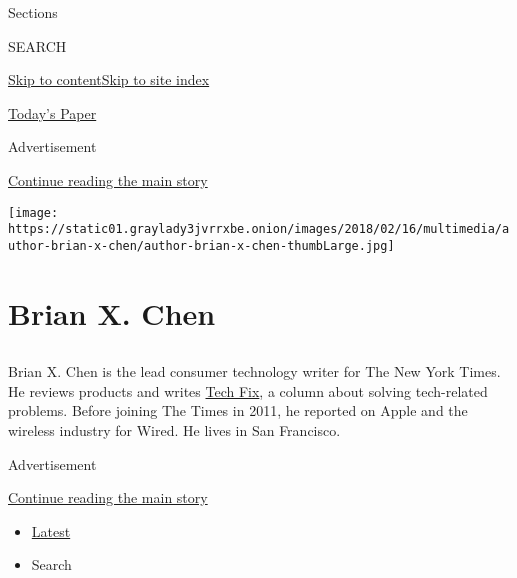 Sections

SEARCH

\protect\hyperlink{site-content}{Skip to
content}\protect\hyperlink{site-index}{Skip to site index}

\href{https://myaccount.nytimes3xbfgragh.onion/auth/login?response_type=cookie\&client_id=vi}{}

\href{https://www.nytimes3xbfgragh.onion/section/todayspaper}{Today's
Paper}

Advertisement

\protect\hyperlink{after-top}{Continue reading the main story}

\texttt{[image: https://static01.graylady3jvrrxbe.onion/images/2018/02/16/multimedia/author-brian-x-chen/author-brian-x-chen-thumbLarge.jpg]}

\hypertarget{brian-x-chen}{%
\section{Brian X. Chen}\label{brian-x-chen}}

\hypertarget{section}{%
\subsection{}\label{section}}

Brian X. Chen is the lead consumer technology writer for The New York
Times. He reviews products and writes
\href{http://www.nytimes3xbfgragh.onion/column/tech-fix}{Tech Fix}, a
column about solving tech-related problems. Before joining The Times in
2011, he reported on Apple and the wireless industry for Wired. He lives
in San Francisco.

Advertisement

\protect\hyperlink{after-mid1}{Continue reading the main story}

\begin{itemize}
\tightlist
\item
  \protect\hyperlink{stream-panel}{Latest}
\item
  Search
\end{itemize}

